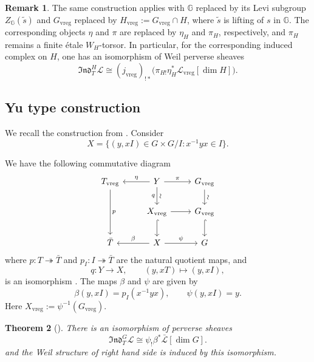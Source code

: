 \documentclass[11pt,letterpaper]{amsart}
\newtheorem{theorem}{Theorem}
\theoremstyle{definition}
\newtheorem{remark}[theorem]{Remark}
\numberwithin{equation}{section}
\numberwithin{theorem}{section}
\begin{document}
\begin{remark}
The same construction applies with $\mathbb{G}$ replaced by its Levi subgroup
$Z_{\mathbb{G}}(\tilde s)$ and $G_{\mathrm{vreg}}$ replaced by
$
H_{\mathrm{vreg}}:=G_{\mathrm{vreg}}\cap H
$, where $\tilde s$ is lifting of $s$ in $\mathbb{G}$.
The corresponding objects
$\eta$ and $\pi$ are replaced by $\eta_H$ and $\pi_H$, respectively,
and $\pi_H$ remains a finite \'{e}tale $W_H$-torsor. In particular, for
the corresponding induced complex on $H$, one has an isomorphism of
Weil perverse sheaves
$$
\mathfrak{Ind}^{H}_{T}\mathcal{L}
\cong
(j_{\mathrm{vreg}})_{!*}
\bigl(
\pi_{H!}\eta_H^*\mathcal{L}_{\mathrm{vreg}}[\dim H]
\bigr).
$$
\end{remark}
\subsection{Yu type construction}\label{iw-sec}
We recall the construction from \cite{INY25}. Consider
\[
 X=\{(y,xI)\in G\times G/I:x^{-1}yx\in I\}.
\]
 
We have the following commutative diagram
\begin{equation}\label{iw-diag}
\begin{tikzcd}
    T_{\mathrm{vreg}} \arrow[dd, "p"] &
    Y \arrow[l, "\eta"'] \arrow[r, "\pi"]\arrow[d, "\sim" sloped, "q"'] &
    G_{\mathrm{vreg}} \arrow[d, "\sim" sloped] \\
    &
    X_{\mathrm{vreg}} \arrow[r] \arrow[hookrightarrow, d] &
    G_{\mathrm{vreg}} \arrow[hookrightarrow, d] \\
    \bar{T} &
    X \arrow[r, "\psi"] \arrow[l, "\beta"'] &
    G
\end{tikzcd}
\end{equation}
where $p:T\twoheadrightarrow\bar T$ and
$p_I:I\twoheadrightarrow\bar T$ are the natural quotient maps, and
\[
q:Y\to X, \qquad (y,xT)\longmapsto(y,xI),
\]
is an isomorphism \cite[Lemma 5.3]{INY25}. The maps $\beta$ and $\psi$
are given by
\begin{equation*}
  \beta(y,xI) =p_{I} (x^{-1} y x), \qquad \psi(y,xI) = y.
\end{equation*}
Here $X_{\mathrm{vreg}}:=\psi^{-1}(G_{\mathrm{vreg}})$.
\begin{theorem}[{\cite[Theorem 5.4]{INY25}}]
\label{iw}
There is an isomorphism of perverse sheaves
\[
\mathfrak{Ind}^{G}_{T}\mathcal{L}
\cong \psi_!\beta^*\bar{\mathcal{L}}[\dim G].
\]
and the Weil structure of right hand side is induced by this isomorphism.
\end{theorem}
\end{document}
